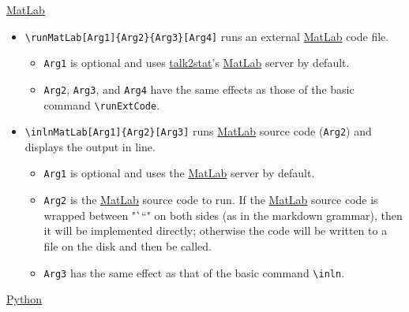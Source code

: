 \documentclass{ltxdoc}
\begin{document}
\href{https://www.mathworks.com/products/matlab.html}{MatLab}

\begin{itemize}
\item \texttt{\textbackslash{}runMatLab[Arg1]\{Arg2\}\{Arg3\}[Arg4]} runs an external
\href{https://www.mathworks.com/products/matlab.html}{MatLab} code file.
\begin{itemize}
\item \texttt{Arg1} is optional and uses
\href{https://pypi.org/project/talk2stat/}{talk2stat}'s
\href{https://www.mathworks.com/products/matlab.html}{MatLab} server by
default.
\item \texttt{Arg2}, \texttt{Arg3}, and \texttt{Arg4} have the same effects as those of the
basic command \texttt{\textbackslash{}runExtCode}.
\end{itemize}
\item \texttt{\textbackslash{}inlnMatLab[Arg1]\{Arg2\}[Arg3]} runs
\href{https://www.mathworks.com/products/matlab.html}{MatLab} source code
(\texttt{Arg2}) and displays the output in line.
\begin{itemize}
\item \texttt{Arg1} is optional and uses the
\href{https://www.mathworks.com/products/matlab.html}{MatLab} server by
default.
\item \texttt{Arg2} is the
\href{https://www.mathworks.com/products/matlab.html}{MatLab} source
code to run. If the
\href{https://www.mathworks.com/products/matlab.html}{MatLab} source
code is wrapped between "```" on both sides (as in the markdown
grammar), then it will be implemented directly; otherwise the code
will be written to a file on the disk and then be called.
\item \texttt{Arg3} has the same effect as that of the basic command \texttt{\textbackslash{}inln}.
\end{itemize}
\end{itemize}

\href{https://www.python.org/}{Python}
\end{document}
